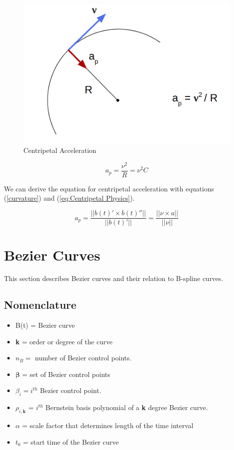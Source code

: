 \documentclass{article}
\begin{document}
\begin{figure}[H]
\centering
\includegraphics[scale=.22]{CentripetalAcceleration.png}
\caption{Centripetal Acceleration}
\label{Centripetal_Acceleration}
\end{figure}

\begin{equation} \label{eq:Centripetal Physics}
    a_p = \frac{\nu^2}{R} = \nu^2 C
\end{equation}

We can derive the equation for centripetal acceleration with equations (\ref{curvature}) and (\ref{eq:Centripetal Physics}).

\begin{equation}
    a_p = \frac{||b(t)' \times b(t)''||}{||b(t)'||} = \frac{||\nu \times a||}{||\nu||}
\end{equation}

\section{Bezier Curves}

This section describes Bezier curves and their relation to B-spline curves.

\subsection{Nomenclature}

\begin{itemize}
  \item[] B(t) = Bezier curve
  \item[] \textbf{k} = order or degree of the curve
  \item[] \(n_B =\) number of Bezier control points.
  \item[] \(\boldsymbol{\beta}\) = set of Bezier control points
  \item[] \(\beta_i = i^{th}\) Bezier control point.
  \item[] \(\rho_{i , \textbf{k}}\) = \(i^{th}\) Bernstein basis polynomial of a \textbf{k} degree Bezier curve.
  \item[] \(\alpha\) = scale factor that determines length of the time interval
  \item[] \(t_0\) = start time of the Bezier curve
\end{itemize}
\end{document}
